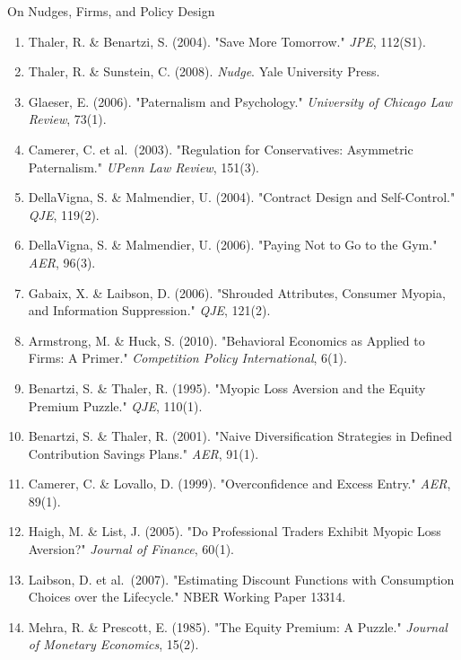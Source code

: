 \documentclass[10pt]{beamer}
\begin{document}
\begin{frame}[allowframebreaks]{On Nudges, Firms, and Policy Design}
\footnotesize
\begin{enumerate}
\item Thaler, R. \& Benartzi, S. (2004). "Save More Tomorrow." \emph{JPE}, 112(S1).
\item Thaler, R. \& Sunstein, C. (2008). \emph{Nudge}. Yale University Press.
\item Glaeser, E. (2006). "Paternalism and Psychology." \emph{University of Chicago Law Review}, 73(1).
\item Camerer, C. et al.\ (2003). "Regulation for Conservatives: Asymmetric Paternalism." \emph{UPenn Law Review}, 151(3).
\item DellaVigna, S. \& Malmendier, U. (2004). "Contract Design and Self-Control." \emph{QJE}, 119(2).
\item DellaVigna, S. \& Malmendier, U. (2006). "Paying Not to Go to the Gym." \emph{AER}, 96(3).
\item Gabaix, X. \& Laibson, D. (2006). "Shrouded Attributes, Consumer Myopia, and Information Suppression." \emph{QJE}, 121(2).
\item Armstrong, M. \& Huck, S. (2010). "Behavioral Economics as Applied to Firms: A Primer." \emph{Competition Policy International}, 6(1).
\item Benartzi, S. \& Thaler, R. (1995). "Myopic Loss Aversion and the Equity Premium Puzzle." \emph{QJE}, 110(1).
\item Benartzi, S. \& Thaler, R. (2001). "Naive Diversification Strategies in Defined Contribution Savings Plans." \emph{AER}, 91(1).
\item Camerer, C. \& Lovallo, D. (1999). "Overconfidence and Excess Entry." \emph{AER}, 89(1).
\item Haigh, M. \& List, J. (2005). "Do Professional Traders Exhibit Myopic Loss Aversion?" \emph{Journal of Finance}, 60(1).
\item Laibson, D. et al.\ (2007). "Estimating Discount Functions with Consumption Choices over the Lifecycle." NBER Working Paper 13314.
\item Mehra, R. \& Prescott, E. (1985). "The Equity Premium: A Puzzle." \emph{Journal of Monetary Economics}, 15(2).
\end{enumerate}
\end{frame}
\end{document}
